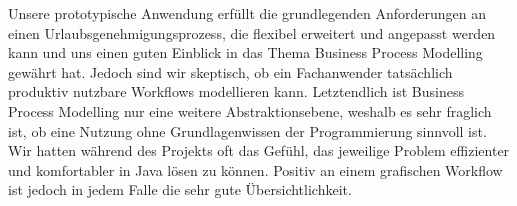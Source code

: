 Unsere prototypische Anwendung erfüllt die grundlegenden Anforderungen an einen Urlaubsgenehmigungsprozess, die flexibel erweitert und angepasst werden kann und uns einen guten Einblick in das Thema Business Process Modelling gewährt hat. Jedoch sind wir skeptisch, ob ein Fachanwender tatsächlich produktiv nutzbare Workflows modellieren kann. Letztendlich ist Business Process Modelling nur eine weitere Abstraktionsebene, weshalb es sehr fraglich ist, ob eine Nutzung ohne Grundlagenwissen der Programmierung sinnvoll ist. Wir hatten während des Projekts oft das Gefühl, das jeweilige Problem effizienter und komfortabler in Java lösen zu können. Positiv an einem grafischen Workflow ist jedoch in jedem Falle die sehr gute Übersichtlichkeit. 